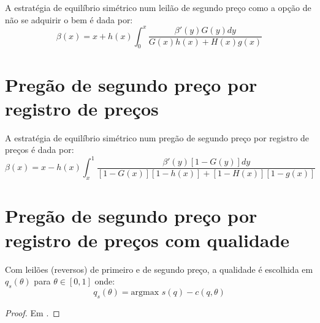 \begin{lema}
	\label{lema:nash-segundo-preco-opcao}
	A estratégia de equilíbrio simétrico num leilão de segundo preço como a opção de não se adquirir o bem é dada por:
	\begin{equation}
		\beta(x) = x + h(x)\int_0^x \frac{\beta'(y)G(y)dy}{G(x)h(x) + H(x)g(x)}
	\end{equation}
\end{lema}

\section{Pregão de segundo preço por registro de preços}

\begin{lema}
	\label{lema:nash-pregao-segundo-preco-rp}
	A estratégia de equilíbrio simétrico num pregão de segundo preço por registro de preços é dada por:
	\begin{equation}
		\beta(x) = x - h(x)\int_x^1 \frac{\beta'(y)[1-G(y)]dy}{[1-G(x)][1-h(x)] + [1-H(x)][1-g(x)]}
	\end{equation}
\end{lema}

\section{Pregão de segundo preço por registro de preços com qualidade}

\begin{lema}
	Com leilões (reversos) de primeiro e de segundo preço, a qualidade é escolhida em $q_s(\theta)$ para $\theta \in [0, 1]$ onde:
	\begin{equation}
		q_s(\theta) = \text{argmax } s(q) - c(q, \theta)
	\end{equation}
	\begin{proof}
		Em \citet{Che1993}.
	\end{proof}
\end{lema}